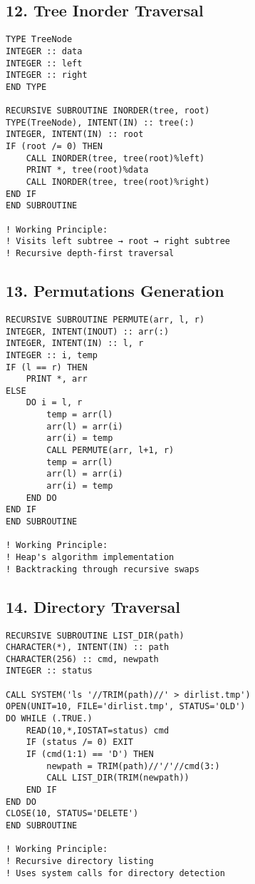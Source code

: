 \documentclass{book}
\begin{document}
\subsection*{12. Tree Inorder Traversal}
\begin{verbatim}
TYPE TreeNode
INTEGER :: data
INTEGER :: left
INTEGER :: right
END TYPE

RECURSIVE SUBROUTINE INORDER(tree, root)
TYPE(TreeNode), INTENT(IN) :: tree(:)
INTEGER, INTENT(IN) :: root
IF (root /= 0) THEN
    CALL INORDER(tree, tree(root)%left)
    PRINT *, tree(root)%data
    CALL INORDER(tree, tree(root)%right)
END IF
END SUBROUTINE

! Working Principle:
! Visits left subtree → root → right subtree
! Recursive depth-first traversal
\end{verbatim}

\subsection*{13. Permutations Generation}
\begin{verbatim}
RECURSIVE SUBROUTINE PERMUTE(arr, l, r)
INTEGER, INTENT(INOUT) :: arr(:)
INTEGER, INTENT(IN) :: l, r
INTEGER :: i, temp
IF (l == r) THEN
    PRINT *, arr
ELSE
    DO i = l, r
        temp = arr(l)
        arr(l) = arr(i)
        arr(i) = temp
        CALL PERMUTE(arr, l+1, r)
        temp = arr(l)
        arr(l) = arr(i)
        arr(i) = temp
    END DO
END IF
END SUBROUTINE

! Working Principle:
! Heap's algorithm implementation
! Backtracking through recursive swaps
\end{verbatim}

\subsection*{14. Directory Traversal}
\begin{verbatim}
RECURSIVE SUBROUTINE LIST_DIR(path)
CHARACTER(*), INTENT(IN) :: path
CHARACTER(256) :: cmd, newpath
INTEGER :: status

CALL SYSTEM('ls '//TRIM(path)//' > dirlist.tmp')
OPEN(UNIT=10, FILE='dirlist.tmp', STATUS='OLD')
DO WHILE (.TRUE.)
    READ(10,*,IOSTAT=status) cmd
    IF (status /= 0) EXIT
    IF (cmd(1:1) == 'D') THEN
        newpath = TRIM(path)//'/'//cmd(3:)
        CALL LIST_DIR(TRIM(newpath))
    END IF
END DO
CLOSE(10, STATUS='DELETE')
END SUBROUTINE

! Working Principle:
! Recursive directory listing
! Uses system calls for directory detection
\end{verbatim}
\end{document}
